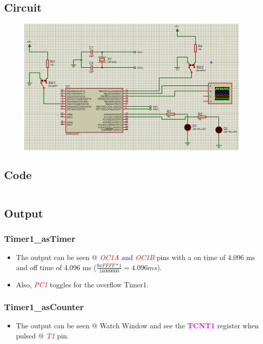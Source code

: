 \documentclass[oneside]{book}
\newcommand{\pinFormat}[1]{\emph{\textcolor{red}{#1}}}
\newcommand{\regFormat}[1]{\textbf{\textcolor{magenta}{#1}}}
\begin{document}
\subsection{Circuit}
\begin{figure}[H]
    \centering
    \includegraphics[height=0.2\textheight]{TimerCounter1_NormalMode.png}
\end{figure}
\subsection{Code}
\inputminted[breaklines, bgcolor=black]{c}{./programFiles/TimerCounter1_NormalMode.c}
\subsection{Output}
\subsubsection{Timer1\_asTimer}
\begin{itemize}
    \item The output can be seen @ \pinFormat{OC1A} and \pinFormat{OC1B} pins with a on time of 4.096 ms and off time of 4.096 ms ($\frac{0xFFFF * 1}{16000000} = 4.096 ms$).
    \item Also, \pinFormat{PC1} toggles for the overflow Timer1.
\end{itemize}
\subsubsection{Timer1\_asCounter}
\begin{itemize}
    \item The output can be seen @ Watch Window and see the \regFormat{TCNT1} register when pulsed @ \pinFormat{T1} pin.
\end{itemize}
\end{document}
